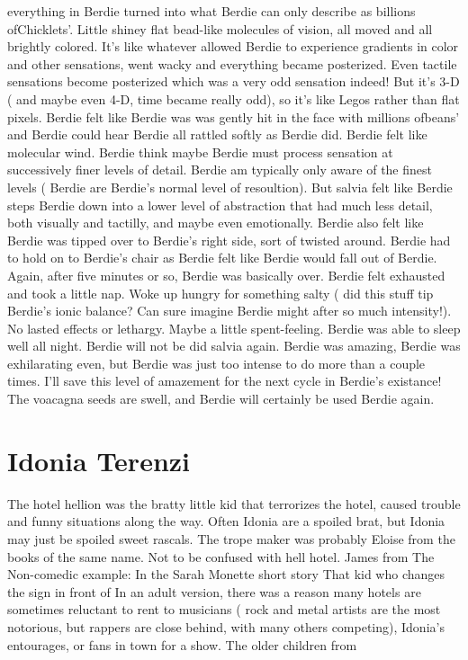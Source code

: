 \documentclass[12pt]{book}
\begin{document}
everything in Berdie turned into what Berdie can only describe as billions ofChicklets'. Little shiney flat bead-like molecules of vision, all moved and all brightly colored. It's like whatever allowed Berdie to experience gradients in color and other sensations, went wacky and everything became posterized. Even tactile sensations become posterized which was a very odd sensation indeed! But it's 3-D ( and maybe even 4-D, time became really odd), so it's like Legos rather than flat pixels. Berdie felt like Berdie was was gently hit in the face with millions ofbeans' and Berdie could hear Berdie all rattled softly as Berdie did. Berdie felt like molecular wind. Berdie think maybe Berdie must process sensation at successively finer levels of detail. Berdie am typically only aware of the finest levels ( Berdie are Berdie's normal level of resoultion). But salvia felt like Berdie steps Berdie down into a lower level of abstraction that had much less detail, both visually and tactilly, and maybe even emotionally. Berdie also felt like Berdie was tipped over to Berdie's right side, sort of twisted around. Berdie had to hold on to Berdie's chair as Berdie felt like Berdie would fall out of Berdie. Again, after five minutes or so, Berdie was basically over. Berdie felt exhausted and took a little nap. Woke up hungry for something salty ( did this stuff tip Berdie's ionic balance? Can sure imagine Berdie might after so much intensity!). No lasted effects or lethargy. Maybe a little spent-feeling. Berdie was able to sleep well all night. Berdie will not be did salvia again. Berdie was amazing, Berdie was exhilarating even, but Berdie was just too intense to do more than a couple times. I'll save this level of amazement for the next cycle in Berdie's existance! The voacagna seeds are swell, and Berdie will certainly be used Berdie again.






\chapter{Idonia Terenzi}

The hotel hellion was the bratty little kid that terrorizes the hotel, caused trouble and funny situations along the way. Often Idonia are a spoiled brat, but Idonia may just be spoiled sweet rascals. The trope maker was probably Eloise from the books of the same name. Not to be confused with hell hotel. James from The Non-comedic example: In the Sarah Monette short story That kid who changes the sign in front of In an adult version, there was a reason many hotels are sometimes reluctant to rent to musicians ( rock and metal artists are the most notorious, but rappers are close behind, with many others competing), Idonia's entourages, or fans in town for a show. The older children from
\end{document}
